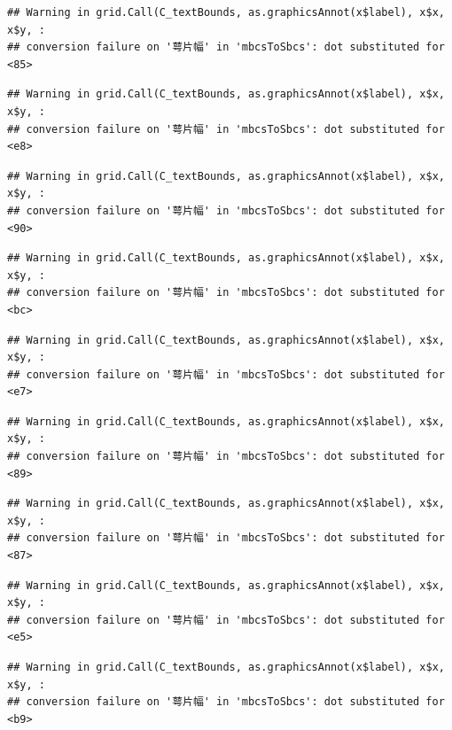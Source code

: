 \documentclass[
]{book}
\begin{document}
\begin{verbatim}
## Warning in grid.Call(C_textBounds, as.graphicsAnnot(x$label), x$x, x$y, :
## conversion failure on '萼片幅' in 'mbcsToSbcs': dot substituted for <85>
\end{verbatim}

\begin{verbatim}
## Warning in grid.Call(C_textBounds, as.graphicsAnnot(x$label), x$x, x$y, :
## conversion failure on '萼片幅' in 'mbcsToSbcs': dot substituted for <e8>
\end{verbatim}

\begin{verbatim}
## Warning in grid.Call(C_textBounds, as.graphicsAnnot(x$label), x$x, x$y, :
## conversion failure on '萼片幅' in 'mbcsToSbcs': dot substituted for <90>
\end{verbatim}

\begin{verbatim}
## Warning in grid.Call(C_textBounds, as.graphicsAnnot(x$label), x$x, x$y, :
## conversion failure on '萼片幅' in 'mbcsToSbcs': dot substituted for <bc>
\end{verbatim}

\begin{verbatim}
## Warning in grid.Call(C_textBounds, as.graphicsAnnot(x$label), x$x, x$y, :
## conversion failure on '萼片幅' in 'mbcsToSbcs': dot substituted for <e7>
\end{verbatim}

\begin{verbatim}
## Warning in grid.Call(C_textBounds, as.graphicsAnnot(x$label), x$x, x$y, :
## conversion failure on '萼片幅' in 'mbcsToSbcs': dot substituted for <89>
\end{verbatim}

\begin{verbatim}
## Warning in grid.Call(C_textBounds, as.graphicsAnnot(x$label), x$x, x$y, :
## conversion failure on '萼片幅' in 'mbcsToSbcs': dot substituted for <87>
\end{verbatim}

\begin{verbatim}
## Warning in grid.Call(C_textBounds, as.graphicsAnnot(x$label), x$x, x$y, :
## conversion failure on '萼片幅' in 'mbcsToSbcs': dot substituted for <e5>
\end{verbatim}

\begin{verbatim}
## Warning in grid.Call(C_textBounds, as.graphicsAnnot(x$label), x$x, x$y, :
## conversion failure on '萼片幅' in 'mbcsToSbcs': dot substituted for <b9>
\end{verbatim}
\end{document}
